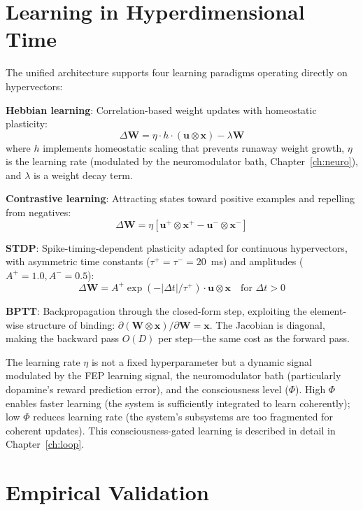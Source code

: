 \documentclass[12pt]{book}
\newcommand{\bind}{\otimes}
\newcommand{\hvx}{\mathbf{x}}
\newcommand{\hvw}{\mathbf{W}}
\newcommand{\hvinput}{\mathbf{u}}
\begin{document}
\section{Learning in Hyperdimensional Time}

The unified architecture supports four learning paradigms operating directly on hypervectors:

\textbf{Hebbian learning}: Correlation-based weight updates with homeostatic plasticity:
\begin{equation}\label{eq:hebbian}
\Delta \hvw = \eta \cdot h \cdot (\hvinput \bind \hvx) - \lambda \hvw
\end{equation}
where $h$ implements homeostatic scaling that prevents runaway weight growth, $\eta$ is the learning rate (modulated by the neuromodulator bath, Chapter~\ref{ch:neuro}), and $\lambda$ is a weight decay term.

\textbf{Contrastive learning}: Attracting states toward positive examples and repelling from negatives:
\begin{equation}
\Delta \hvw = \eta \left[\hvinput^+ \bind \hvx^+ - \hvinput^- \bind \hvx^-\right]
\end{equation}

\textbf{STDP}: Spike-timing-dependent plasticity adapted for continuous hypervectors, with asymmetric time constants ($\tau^+ = \tau^- = 20$~ms) and amplitudes ($A^+ = 1.0, A^- = 0.5$):
\begin{equation}
\Delta \hvw = A^+ \exp(-|\Delta t|/\tau^+) \cdot \hvinput \bind \hvx \quad \text{for } \Delta t > 0
\end{equation}

\textbf{BPTT}: Backpropagation through the closed-form step, exploiting the element-wise structure of binding: $\partial(\hvw \bind \hvx)/\partial \hvw = \hvx$. The Jacobian is diagonal, making the backward pass $O(D)$ per step---the same cost as the forward pass.

The learning rate $\eta$ is not a fixed hyperparameter but a dynamic signal modulated by the FEP learning signal, the neuromodulator bath (particularly dopamine's reward prediction error), and the consciousness level ($\Phi$). High $\Phi$ enables faster learning (the system is sufficiently integrated to learn coherently); low $\Phi$ reduces learning rate (the system's subsystems are too fragmented for coherent updates). This consciousness-gated learning is described in detail in Chapter~\ref{ch:loop}.

\section{Empirical Validation}
\end{document}
